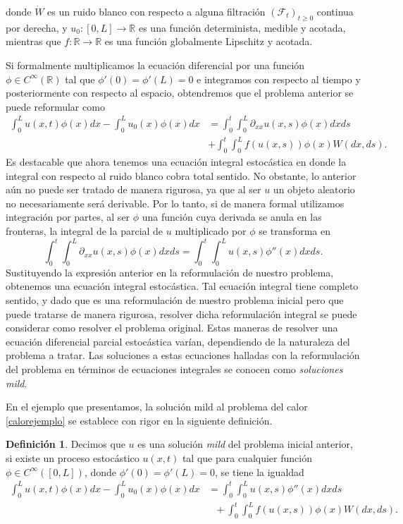 \documentclass[letterpaper,twoside,12pt]{book}
\newcommand{\R}{\mathbb{R}}
\newcommand{\F}{\mathcal{F}}
\newcommand{\W}{\dot{W}}
\newcommand{\1}{\mathds{1}}
\renewcommand{\to}{\rightarrow}
\theoremstyle{definition}
\newtheorem{dfn}{Definición}
\theoremstyle{definition}
\theoremstyle{remark}
\theoremstyle{definition}
\theoremstyle{definition}
\theoremstyle{definition}
\theoremstyle{definition}
\theoremstyle{definition}
\begin{document}
donde $\W$ es un ruido blanco con respecto a alguna filtración $(\F_t)_{t\geq0}$ continua por derecha, y $u_0:[0,L]\to\R$ es una función determinista, medible y acotada, mientras que $f:\R\to\R$ es una función globalmente Lipschitz y acotada.

Si formalmente multiplicamos la ecuación diferencial por una función $\phi \in C^{\infty}(\R)$ tal que $\phi'(0)=\phi'(L)=0$ e integramos con respecto al tiempo y posteriormente con respecto al espacio, obtendremos que el problema anterior se puede reformular como 
\begin{align*}
   \int_{0}^{L}u(x,t)\phi(x)dx-\int_{0}^{L}u_0(x)\phi(x)dx&=\int_0^{t}\int_0^{L}\partial_{xx}u(x,s)\phi(x)dxds\\
   &+\int_{0}^{t}\int_{0}^{L}f(u(x,s))\phi(x)W(dx, ds).    
   \end{align*}
Es destacable que ahora tenemos una ecuación integral estocástica en donde la integral con respecto al ruido blanco cobra total sentido. No obstante, lo anterior aún no puede ser tratado de manera rigurosa, ya que al ser $u$ un objeto aleatorio no necesariamente será derivable. Por lo tanto, si de manera formal utilizamos integración por partes, al ser $\phi$ una función cuya derivada se anula en las fronteras, la integral de la parcial de $u$ multiplicado por $\phi$ se transforma en
\[
   \int_{0}^{t}\int_{0}^{L}\partial_{xx}u(x,s)\phi(x)dx ds=\int_{0}^{t}\int_{0}^{L}u(x,s)\phi''(x)dx ds.
\]
Sustituyendo la expresión anterior en la reformulación de nuestro problema, obtenemos una ecuación integral estocástica. Tal ecuación integral tiene completo sentido, y dado que es una reformulación de nuestro problema inicial pero que puede tratarse de manera rigurosa, resolver dicha reformulación integral se puede considerar como resolver el problema original. Estas maneras de resolver una ecuación diferencial parcial estocástica varían, dependiendo de la naturaleza del problema a tratar. Las soluciones a estas ecuaciones halladas con la reformulación del problema en términos de ecuaciones integrales se conocen como \textit{soluciones mild}.

En el ejemplo que presentamos, la solución mild al problema del calor \eqref{calorejemplo} se establece con rigor en la siguiente definición.

\begin{dfn} 
Decimos que $u$ es una solución \textit{mild} del problema inicial anterior, si existe un proceso estocástico $u(x,t)$ tal que para cualquier función $\phi\in C^{\infty}([0,L])$, donde $\phi'(0)=\phi'(L)=0$, se tiene la igualdad 
\begin{align*}
   \int_{0}^{L}u(x,t)\phi(x)dx-\int_{0}^{L}u_0(x)\phi(x)dx&=\int_{0}^{t}\int_{0}^{L}u(x,s)\phi''(x)dx ds\\
   & \ \ \ +\int_{0}^{t}\int_{0}^{L}f(u(x,s))\phi(x)W(dx, ds).  
\end{align*}
\end{dfn}
\end{document}
